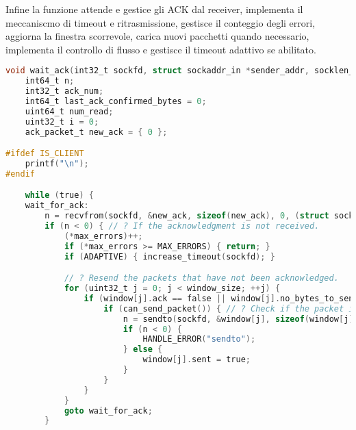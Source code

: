 Infine la funzione  attende e gestice gli ACK dal receiver, implementa il meccaniscmo di timeout e ritrasmissione, gestisce il conteggio degli errori, aggiorna la finestra scorrevole, carica nuovi pacchetti quando necessario, implementa il controllo di flusso e gestisce il timeout adattivo se abilitato.

\begin{lstlisting}[caption={\lstinlinebg{src/protocol.c}},language=C,keywords={print_progress, ADAPTIVE, decrease_timeout, increase_timeout, goto, can_send_packet, false, MSG_CONFIRM, for, fread, PACKET_SIZE, break, ifdef, endif, IS_CLIENT, timeval, gettimeofday, send_data_to_receiver, void, while, true, ack_packet_t, recvfrom, WRITE_BYTE_ERROR, MAX_ERRORS, double, SPQR_KB, FILE_TRANSFER_FAILED, EXIT_SUCCESS, FILE_TRANSFER_COMPLETED, printf, sendto, SEQ_NUM_ERROR, sizeof, int8_t, int32_t, uint16_t, int64_t, struct, sockaddr, sockaddr_in, char, socklen_t, uint32_t, uint64_t, WINDOW_SIZE, stat, fstat, fileno, set_timeout, FILE, NULL, HANDLE_ERROR, return, TRANSFER_ERROR, if, else, perror, exit, fprintf, stderr, MAX_RETRIES, spqr_assert, spqr_free, fclose, free, spqr_assert_ptr, fseek, SEEK_END, ftell, rewind, malloc, memset, sizeof, packet_t, MAX_READ_LINE, MAX_WINDOW_SIZE, MAX_PACKETS, MAX_ACKS}]
void wait_ack(int32_t sockfd, struct sockaddr_in *sender_addr, socklen_t len, packet_t *window, uint32_t window_size, FILE *file, int64_t size_file, uint16_t *max_errors, uint64_t *counter, int32_t *no_packets_to_send) {
    int64_t n;
    int32_t ack_num;
    int64_t last_ack_confirmed_bytes = 0;
    uint64_t num_read;
    uint32_t i = 0;
    ack_packet_t new_ack = { 0 };

#ifdef IS_CLIENT
    printf("\n");
#endif

    while (true) {
    wait_for_ack:
        n = recvfrom(sockfd, &new_ack, sizeof(new_ack), 0, (struct sockaddr *) sender_addr, &len); // ? Wait for the acknowledgment from the receiver.
        if (n < 0) { // ? If the acknowledgment is not received.
            (*max_errors)++;
            if (*max_errors >= MAX_ERRORS) { return; }
            if (ADAPTIVE) { increase_timeout(sockfd); }

            // ? Resend the packets that have not been acknowledged.
            for (uint32_t j = 0; j < window_size; ++j) {
                if (window[j].ack == false || window[j].no_bytes_to_send > last_ack_confirmed_bytes) {
                    if (can_send_packet()) { // ? Check if the packet is lost.
                        n = sendto(sockfd, &window[j], sizeof(window[j]), MSG_CONFIRM, (struct sockaddr *) sender_addr, sizeof(*sender_addr));
                        if (n < 0) {
                            HANDLE_ERROR("sendto");
                        } else {
                            window[j].sent = true;
                        }
                    }
                }
            }
            goto wait_for_ack;
        }


\end{lstlisting}
